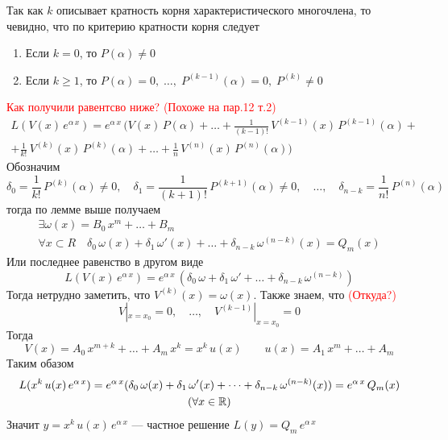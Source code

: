 \begin{Proof}
    Так как $k$ описывает кратность корня характеристического многочлена, то чевидно, что по критерию кратности корня следует
    \begin{enumerate}
        \item[\textbullet] Если $k=0$, то $P(\alpha) \neq 0$
        
        \item[\textbullet] Если $k \geqslant 1$, то $P(\alpha)=0,\; \dots,\; P^{(k-1)}(\alpha)=0,\; P^{(k)} \neq 0$
    \end{enumerate}
    \textcolor{red}{Как получили равентсво ниже? (Похоже на пар.12 т.2)}
    \begin{multline*}
        L(V(x)\,e^{\alpha\,x}) = e^{\alpha\, x}\,(V(x)\,P(\alpha) +\dots + \frac{1}{(k-1)!}\,V^{(k-1)}(x)\,P^{(k-1)}(\alpha) +\\
        + \frac{1}{k!}\,V^{(k)}(x)\,P^{(k)}(\alpha) + \dots + \frac{1}{n}\,V^{(n)}(x)\,P^{(n)}(\alpha))
    \end{multline*}
    Обозначим
    \begin{equation*}
        \delta_0=\frac{1}{k!}\,P^{(k)}(\alpha) \neq 0, \quad \delta_1=\frac{1}{(k+1)!}\,P^{(k+1)}(\alpha) \neq 0,\quad \dots,\quad \delta_{n-k}=\frac{1}{n!}\,P^{(n)}(\alpha)
    \end{equation*}
    тогда по лемме выше получаем 
    \begin{multline*}
        \exists \omega(x) = B_0\,x^m + \dots + B_m\\ \forall x \subset R \quad \delta_0\,\omega(x) + \delta_1\,\omega'(x) + \dots + \delta_{n-k}\,\omega^{(n-k)}(x) = Q_m(x)
    \end{multline*}
    Или последнее равенство в другом виде
    \begin{equation*}
        L(V(x)\,e^{\alpha\,x}) = e^{\alpha\, x}\,(\delta_0\,\omega + \delta_1\,\omega' + \dots + \delta_{n-k}\,\omega^{(n-k)})
    \end{equation*}
    Тогда нетрудно заметить, что $V^{(k)}(x) = \omega(x)$.
    Также знаем, что \textcolor{red}{(Откуда?)} 
    \[
        V|_{x=x_0} = 0,\quad \dots,\quad V^{(k-1)}|_{x=x_0}=0
    \]
    Тогда
    \[
        V(x) = A_0\,x^{m+k}+\dots+A_m\,x^k = x^k\,u(x) \qquad u(x)=A_1\,x^m+ \dots + A_m
    \]
    Таким обазом
    \begin{multline*}
        L(x^k\,u(x)\,e^{\alpha\,x}) = e^{\alpha\,x}(\delta_0\,\omega(x) + \delta_1\,\omega'(x) + \dots + \delta_{n-k}\,\omega^{(n-k)}(x)) = e^{\alpha\,x}\,Q_m(x) \\ (\forall x \in \mathbb{R})
    \end{multline*}
    Значит $y=x^k\,u(x)\,e^{\alpha\,x}$ --- частное решение $L(y)=Q_m\,e^{\alpha\,x}$\\    
\end{Proof}

